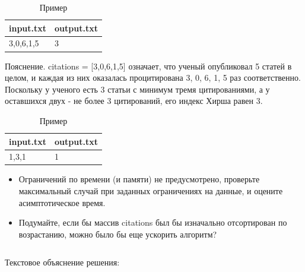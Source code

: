 \begin{table}[H]
    \caption{Пример}
	\begin{center}
		\begin{tabular}{|l|l|}
			\hline
			  input.txt  &  output.txt \\ \hline
			    3,0,6,1,5  &  3 \\ \hline
		\end{tabular}
		\label{tabular:tab_examp_2}
	\end{center}
\end{table}

Пояснение. citations = [3,0,6,1,5] означает, что ученый опубликовал 5 статей в целом, и каждая из них оказалась процитирована 3, 0, 6, 1, 5 раз соответственно. Поскольку у ученого есть 3 статьи с минимум тремя цитированиями, а у оставшихся двух - не более 3 цитирований, его индекс Хирша равен 3.
\begin{table}[H]
    \caption{Пример}
	\begin{center}
		\begin{tabular}{|l|l|}
			\hline
			  input.txt  &  output.txt \\ \hline
			    1,3,1  &  1 \\ \hline
		\end{tabular}
		\label{tabular:tab_examp_2}
	\end{center}
\end{table}


\begin{itemize}
	\item Ограничений по времени (и памяти) не предусмотрено, проверьте максимальный случай при заданных ограничениях на данные, и оцените асимптотическое время.

	\item Подумайте, если бы массив citations был бы изначально отсортирован по возрастанию, можно было бы еще ускорить алгоритм?

\end{itemize}

\begin{code}
	\inputminted[breaklines=true, xleftmargin=1em, linenos, frame=single, framesep=10pt, fontsize=\footnotesize, firstline=1, lastline=38]{haskell}{listings/12.py}
	\caption{Код второй задачи}
\end{code}
Текстовое объяснение решения:

